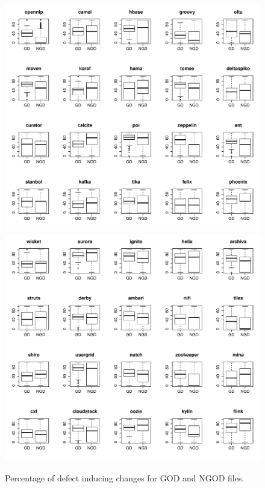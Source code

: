 \begin{figure}[tb]
	\centering
	\includegraphics[width=120mm]{figures/chapter4/rq2_god_boxplots_1}
	\includegraphics[width=120mm]{figures/chapter4/rq2_god_boxplots_2}
	\caption{Percentage of defect inducing changes for GOD and NGOD files.}
	\label{figure:percentage_of_bug_inducing_god_vs_ngod}
\end{figure}


